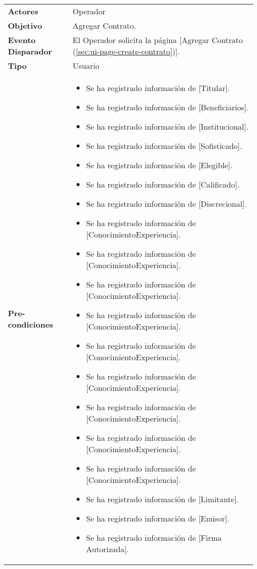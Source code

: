 	\begin{tabular}{ p{3.5cm} p{11.5cm} }
		\textbf{Actores} & Operador\\
		\textbf{Objetivo} & Agregar Contrato.\\
		\textbf{Evento Disparador} & El Operador solicita la p\'agina [Agregar Contrato (\ref{sec:ui-page-create-contrato})].\\
		\textbf{Tipo} & Usuario\\
		\textbf{Pre-condiciones} &
			\begin{minipage}[t]{0.6\textwidth}
			\begin{itemize}[noitemsep,nolistsep]
			\setlength{\itemindent}{-.5cm}
				\item Se ha registrado informaci\'on de [Titular].
				\item Se ha registrado informaci\'on de [Beneficiarios].
				\item Se ha registrado informaci\'on de [Institucional].
				\item Se ha registrado informaci\'on de [Sofisticado].
				\item Se ha registrado informaci\'on de [Elegible].
				\item Se ha registrado informaci\'on de [Calificado].
				\item Se ha registrado informaci\'on de [Discrecional].
				\item Se ha registrado informaci\'on de [ConocimientoExperiencia].
				\item Se ha registrado informaci\'on de [ConocimientoExperiencia].
				\item Se ha registrado informaci\'on de [ConocimientoExperiencia].
				\item Se ha registrado informaci\'on de [ConocimientoExperiencia].
				\item Se ha registrado informaci\'on de [ConocimientoExperiencia].
				\item Se ha registrado informaci\'on de [ConocimientoExperiencia].
				\item Se ha registrado informaci\'on de [ConocimientoExperiencia].
				\item Se ha registrado informaci\'on de [ConocimientoExperiencia].
				\item Se ha registrado informaci\'on de [ConocimientoExperiencia].
				\item Se ha registrado informaci\'on de [Limitante].
				\item Se ha registrado informaci\'on de [Emisor].
				\item Se ha registrado informaci\'on de [Firma Autorizada].

\end{itemize}
\end{minipage}
\end{tabular}
